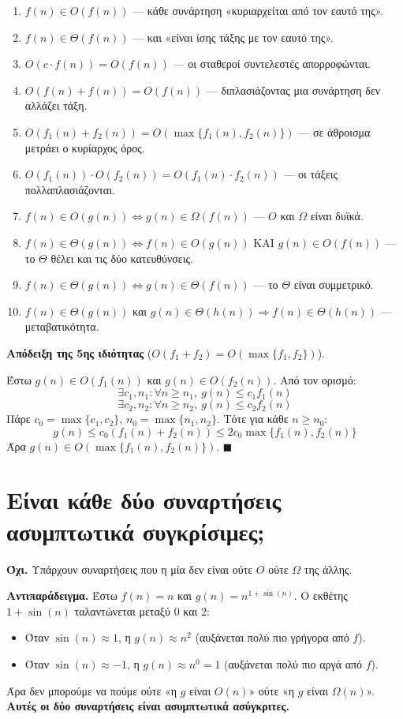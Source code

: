 \documentclass[11pt,a4paper]{article}
\begin{document}
\begin{enumerate}
  \item $f(n) \in O(f(n))$ --- κάθε συνάρτηση «κυριαρχείται από τον εαυτό της».
  \item $f(n) \in \Theta(f(n))$ --- και «είναι ίσης τάξης με τον εαυτό της».
  \item $O(c \cdot f(n)) = O(f(n))$ --- οι σταθεροί συντελεστές απορροφώνται.
  \item $O(f(n) + f(n)) = O(f(n))$ --- διπλασιάζοντας μια συνάρτηση δεν αλλάζει
  τάξη.
  \item $O(f_1(n) + f_2(n)) = O(\max\{f_1(n), f_2(n)\})$ --- σε άθροισμα μετράει ο
  κυρίαρχος όρος.
  \item $O(f_1(n)) \cdot O(f_2(n)) = O(f_1(n) \cdot f_2(n))$ --- οι τάξεις
  πολλαπλασιάζονται.
  \item $f(n) \in O(g(n)) \iff g(n) \in \Omega(f(n))$ --- $O$ και $\Omega$ είναι
  δυϊκά.
  \item $f(n) \in \Theta(g(n)) \iff f(n) \in O(g(n))$ ΚΑΙ $g(n) \in O(f(n))$ ---
  το $\Theta$ θέλει και τις δύο κατευθύνσεις.
  \item $f(n) \in \Theta(g(n)) \iff g(n) \in \Theta(f(n))$ --- το $\Theta$ είναι
  συμμετρικό.
  \item $f(n) \in \Theta(g(n))$ και $g(n) \in \Theta(h(n)) \Rightarrow f(n) \in
  \Theta(h(n))$ --- μεταβατικότητα.
\end{enumerate}

\begin{examplebox}
\textbf{Απόδειξη της 5ης ιδιότητας} ($O(f_1 + f_2) = O(\max\{f_1, f_2\})$).

Έστω $g(n) \in O(f_1(n))$ και $g(n) \in O(f_2(n))$. Από τον ορισμό:
\[
\exists c_1, n_1 : \forall n \ge n_1,\ g(n) \le c_1 f_1(n)
\]
\[
\exists c_2, n_2 : \forall n \ge n_2,\ g(n) \le c_2 f_2(n)
\]
Πάρε $c_0 = \max\{c_1, c_2\}$, $n_0 = \max\{n_1, n_2\}$. Τότε για κάθε
$n \ge n_0$:
\[
g(n) \le c_0 (f_1(n) + f_2(n)) \le 2 c_0 \max\{f_1(n), f_2(n)\}
\]
Άρα $g(n) \in O(\max\{f_1(n), f_2(n)\})$. $\blacksquare$
\end{examplebox}

\section{Είναι κάθε δύο συναρτήσεις ασυμπτωτικά συγκρίσιμες;}

\textbf{Όχι.} Υπάρχουν συναρτήσεις που η μία δεν είναι ούτε $O$ ούτε $\Omega$ της
άλλης.

\begin{examplebox}
\textbf{Αντιπαράδειγμα.} Έστω $f(n) = n$ και $g(n) = n^{1 + \sin(n)}$. Ο εκθέτης
$1 + \sin(n)$ ταλαντώνεται μεταξύ $0$ και $2$:
\begin{itemize}
  \item Όταν $\sin(n) \approx 1$, η $g(n) \approx n^2$ (αυξάνεται πολύ πιο
  γρήγορα από $f$).
  \item Όταν $\sin(n) \approx -1$, η $g(n) \approx n^0 = 1$ (αυξάνεται πολύ πιο
  αργά από $f$).
\end{itemize}
Άρα δεν μπορούμε να πούμε ούτε «η $g$ είναι $O(n)$» ούτε «η $g$ είναι
$\Omega(n)$». \textbf{Αυτές οι δύο συναρτήσεις είναι ασυμπτωτικά ασύγκριτες.}
\end{examplebox}
\end{document}
